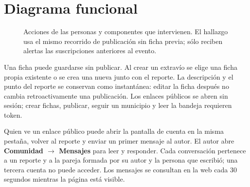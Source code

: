 \documentclass[11pt,letterpaper]{article}
\begin{document}
\section{Diagrama funcional}
\begin{figure}[H]\centering
{}
\caption{Acciones de las personas y componentes que intervienen. El hallazgo usa el mismo recorrido de publicación sin ficha previa; sólo reciben alertas las suscripciones anteriores al evento.}
\end{figure}
Una ficha puede guardarse sin publicar. Al crear un extravío se elige una ficha propia existente o se crea una nueva junto con el reporte. La descripción y el punto del reporte se conservan como instantánea: editar la ficha después no cambia retroactivamente una publicación. Los enlaces públicos se abren sin sesión; crear fichas, publicar, seguir un municipio y leer la bandeja requieren token.

Quien ve un enlace público puede abrir la pantalla de cuenta en la misma pestaña, volver al reporte y enviar un primer mensaje al autor. El autor abre \textbf{Comunidad $\to$ Mensajes} para leer y responder. Cada conversación pertenece a un reporte y a la pareja formada por su autor y la persona que escribió; una tercera cuenta no puede acceder. Los mensajes se consultan en la web cada 30 segundos mientras la página está visible.
\end{document}
